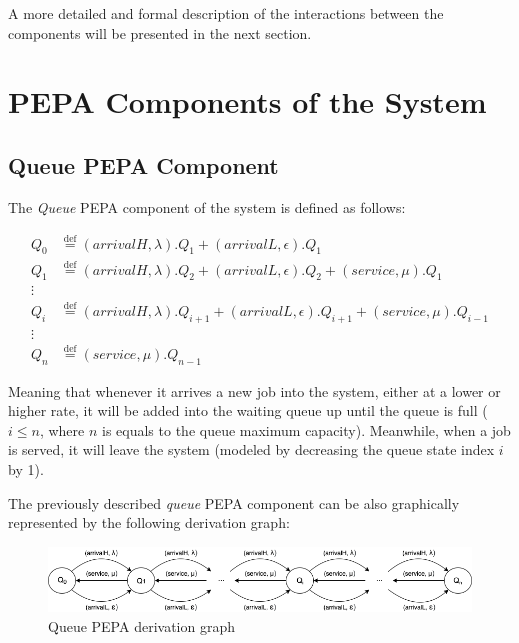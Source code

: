 \documentclass{article}
\newcommand*{\defeq}{\stackrel{\text{def}}{=}}
\begin{document}
\noindent A more detailed and formal description of the interactions between the components will be presented in the next section.

\section{PEPA Components of the System}

\subsection{Queue PEPA Component}

The \textit{Queue} PEPA component of the system is defined as follows:

\begin{align*} 
    Q_{0} &\defeq (arrivalH, \lambda).Q_{1} + (arrivalL, \epsilon).Q_{1} \\
    Q_{1} &\defeq (arrivalH, \lambda).Q_{2} + (arrivalL, \epsilon).Q_{2} + (service, \mu).Q_{1} \\
    \vdots \\
    Q_{i} &\defeq (arrivalH, \lambda).Q_{i+1} + (arrivalL, \epsilon).Q_{i+1} + (service, \mu).Q_{i-1} \\
    \vdots \\
    Q_{n} &\defeq (service, \mu).Q_{n-1}
\end{align*}

\noindent Meaning that whenever it arrives a new job into the system, either at a lower or higher rate, it will be added into the waiting queue up until the queue is full (\(i \leq n\), where \(n\) is equals to the queue maximum capacity).\newline
Meanwhile, when a job is served, it will leave the system (modeled by decreasing the queue state index \(i\) by 1).\newline

\par\noindent The previously described \textit{queue} PEPA component can be also  graphically represented by the following derivation graph:

\begin{figure}[H]
    \centering
    \includegraphics[width=1.0\textwidth]{queue-derivation-graph.png}
    \caption{Queue PEPA derivation graph}
    \label{fig:queue-derivation-graph}
\end{figure}
\end{document}
